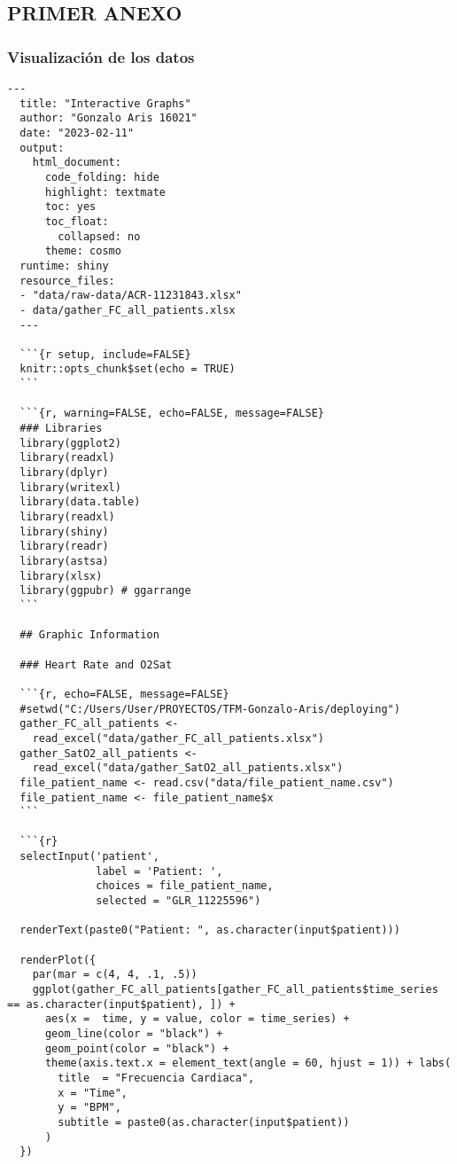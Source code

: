 \subsection{PRIMER ANEXO}\label{sec:anexo1}

\subsubsection{Visualización de los datos}\label{sec:codigo-visualizacion}
\lstset{style=mystyle2} 
\begin{lstlisting}[style=mystyle2,caption={Código Visualización de los Datos}, label={lst:codigo-visualizacion}]
  ---
  title: "Interactive Graphs"
  author: "Gonzalo Aris 16021"
  date: "2023-02-11"
  output:
    html_document:
      code_folding: hide
      highlight: textmate
      toc: yes
      toc_float:
        collapsed: no
      theme: cosmo
  runtime: shiny
  resource_files:
  - "data/raw-data/ACR-11231843.xlsx"
  - data/gather_FC_all_patients.xlsx
  ---
  
  ```{r setup, include=FALSE}
  knitr::opts_chunk$set(echo = TRUE)
  ```
  
  ```{r, warning=FALSE, echo=FALSE, message=FALSE}
  ### Libraries
  library(ggplot2)
  library(readxl)
  library(dplyr)
  library(writexl)
  library(data.table)
  library(readxl)
  library(shiny)
  library(readr)
  library(astsa)
  library(xlsx)
  library(ggpubr) # ggarrange
  ```
  
  ## Graphic Information
  
  ### Heart Rate and O2Sat
  
  ```{r, echo=FALSE, message=FALSE}
  #setwd("C:/Users/User/PROYECTOS/TFM-Gonzalo-Aris/deploying")
  gather_FC_all_patients <-
    read_excel("data/gather_FC_all_patients.xlsx")
  gather_SatO2_all_patients <-
    read_excel("data/gather_SatO2_all_patients.xlsx")
  file_patient_name <- read.csv("data/file_patient_name.csv")
  file_patient_name <- file_patient_name$x 
  ```
  
  ```{r}
  selectInput('patient',
              label = 'Patient: ',
              choices = file_patient_name,
              selected = "GLR_11225596")
  
  renderText(paste0("Patient: ", as.character(input$patient)))
  
  renderPlot({
    par(mar = c(4, 4, .1, .5))
    ggplot(gather_FC_all_patients[gather_FC_all_patients$time_series == as.character(input$patient), ]) +
      aes(x =  time, y = value, color = time_series) +
      geom_line(color = "black") +
      geom_point(color = "black") +
      theme(axis.text.x = element_text(angle = 60, hjust = 1)) + labs(
        title  = "Frecuencia Cardiaca",
        x = "Time",
        y = "BPM",
        subtitle = paste0(as.character(input$patient))
      )
  })
  

\end{lstlisting}
